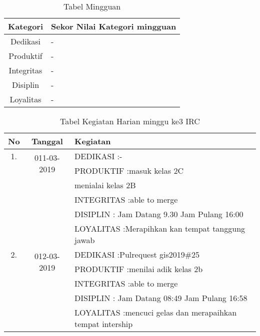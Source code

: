 \begin{table}[h]
\begin{center}
\caption{Tabel Mingguan}
\begin{tabular}{|c|l|}
\hline
Kategori& Sekor Nilai Kategori mingguan\\
\hline
Dedikasi & -\\
\hline
Produktif & -\\
\hline
Integritas & -\\
\hline
Disiplin & -\\
\hline
Loyalitas & -\\
\hline
\end{tabular}
\end{center}
\label {Tabel:contoh} 
\end{table}

\begin{table}[h]
\caption{Tabel Kegiatan Harian minggu ke3 IRC}
\centering
\begin{tabular}{|c|c|l|}
\hline
No&Tanggal&Kegiatan\\
\hline
1.&\multirow{2}{*}{011-03-2019}
&DEDIKASI :- \\
&&PRODUKTIF :masuk kelas 2C\\
		     &&menialai kelas 2B\\
&&INTEGRITAS :able to merge\\
&&DISIPLIN : Jam Datang 9.30 Jam Pulang 16:00\\
&&LOYALITAS :Merapihkan kan tempat tanggung jawab\\
\hline
2.&\multirow{2}{*}{012-03-2019}
&DEDIKASI :Pulrequest gis2019\#25 \\
&&PRODUKTIF :menilai adik kelas 2b\\
&&INTEGRITAS :able to merge\\
&&DISIPLIN : Jam Datang 08:49 Jam Pulang 16:58\\
&&LOYALITAS :mencuci gelas dan merapaihkan tempat intership\\
\hline
\end{tabular}
\label{table:contoh}
\end{table}